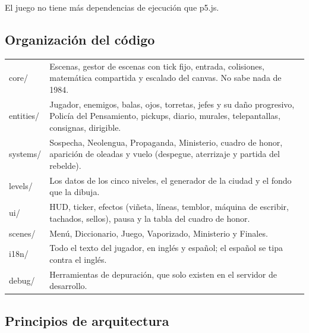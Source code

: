 \documentclass[11pt,a4paper]{article}
\begin{document}
El juego no tiene más dependencias de ejecución que p5.js.

\subsection{Organización del código}

\begin{center}
\small
\begin{tabularx}{\textwidth}{>{\ttfamily}l L}
  \toprule
  core/ & Escenas, gestor de escenas con tick fijo, entrada, colisiones, matemática compartida y escalado del canvas. No sabe nada de 1984. \\
  entities/ & Jugador, enemigos, balas, ojos, torretas, jefes y su daño progresivo, Policía del Pensamiento, pickups, diario, murales, telepantallas, consignas, dirigible. \\
  systems/ & Sospecha, Neolengua, Propaganda, Ministerio, cuadro de honor, aparición de oleadas y vuelo (despegue, aterrizaje y partida del rebelde). \\
  levels/ & Los datos de los cinco niveles, el generador de la ciudad y el fondo que la dibuja. \\
  ui/ & HUD, ticker, efectos (viñeta, líneas, temblor, máquina de escribir, tachados, sellos), pausa y la tabla del cuadro de honor. \\
  scenes/ & Menú, Diccionario, Juego, Vaporizado, Ministerio y Finales. \\
  i18n/ & Todo el texto del jugador, en inglés y español; el español se tipa contra el inglés. \\
  debug/ & Herramientas de depuración, que solo existen en el servidor de desarrollo. \\
  \bottomrule
\end{tabularx}
\end{center}

\subsection{Principios de arquitectura}
\end{document}
